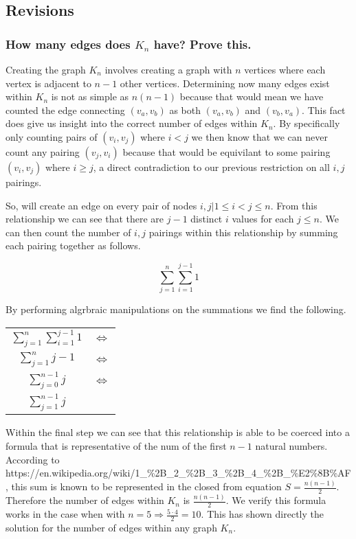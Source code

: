\documentclass{article}
\begin{document}
\subsection{Revisions}
\subsubsection{How many edges does $K_n$ have? Prove this.}
Creating the graph $K_n$ involves creating a graph with $n$ vertices where each vertex is adjacent to $n-1$ other vertices. Determining now many edges exist within $K_n$ is not as simple as $n(n-1)$ because that would mean we have counted the edge connecting $(v_a, v_b)$ as both $(v_a, v_b)$ and $(v_b, v_a)$. This fact does give us insight into the correct number of edges within $K_n$. By specifically only counting pairs of $(v_i, v_j)$ where $i < j$ we then know that we can never count any pairing $(v_j, v_i)$ because that would be equivilant to some pairing $(v_i, v_j)$ where $i \geq j$, a direct contradiction to our previous restriction on all $i,j$ pairings.

So, will create an edge on every pair of nodes $i,j | 1 \leq i < j \leq n$. From this relationship we can see that there are $j-1$ distinct $i$ values for each $j \leq n$. We can then count the number of $i,j$ pairings within this relationship by summing each pairing together as follows.

\begin{equation}
  \sum_{j=1}^{n} \sum_{i=1}^{j-1} 1
\end{equation}

By performing algrbraic manipulations on the summations we find the following.

\begin{center}
  \begin{tabular}{cc}
    $\sum_{j=1}^{n} \sum_{i=1}^{j-1} 1$ & $\iff$ \\
    $\sum_{j=1}^{n} j-1$ & $\iff$ \\
    $\sum_{j=0}^{n-1} j$ & $\iff$ \\
    $\sum_{j=1}^{n-1} j$
  \end{tabular}
\end{center}

Within the final step we can see that this relationship is able to be coerced into a formula that is representative of the num of the first $n-1$ natural numbers. According to https://en.wikipedia.org/wiki/1\_\%2B\_2\_\%2B\_3\_\%2B\_4\_\%2B\_\%E2\%8B\%AF, this sum is known to be represented in the closed from equation $S = \frac{n(n-1)}{2}$. Therefore the number of edges within $K_n$ is $\frac{n(n-1)}{2}$. We verify this formula works in the case when with $n=5 \Rightarrow \frac{5\cdot4}{2}=10$. This has shown directly the solution for the number of edges within any graph $K_n$.
\end{document}

